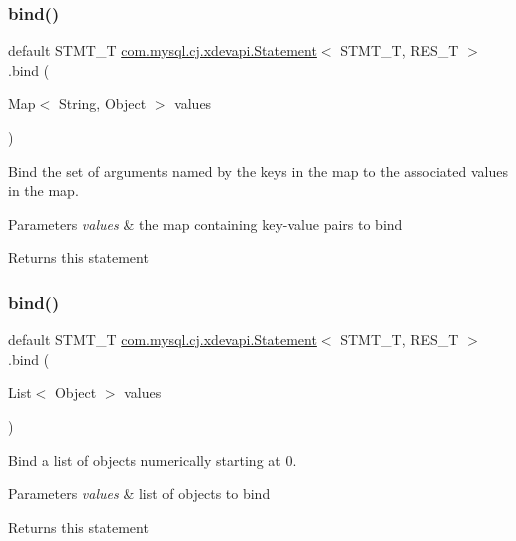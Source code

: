 \subsubsection{\texorpdfstring{bind()}{bind()}\hspace{0.1cm}{\footnotesize\ttfamily [2/4]}}
{\footnotesize\ttfamily default S\+T\+M\+T\+\_\+T \mbox{\hyperlink{interfacecom_1_1mysql_1_1cj_1_1xdevapi_1_1_statement}{com.\+mysql.\+cj.\+xdevapi.\+Statement}}$<$ S\+T\+M\+T\+\_\+T, R\+E\+S\+\_\+T $>$.bind (\begin{DoxyParamCaption}\item[{Map$<$ String, Object $>$}]{values }\end{DoxyParamCaption})}

Bind the set of arguments named by the keys in the map to the associated values in the map.


\begin{DoxyParams}{Parameters}
{\em values} & the map containing key-\/value pairs to bind \\
\hline
\end{DoxyParams}
\begin{DoxyReturn}{Returns}
this statement 
\end{DoxyReturn}
\mbox{\label{interfacecom_1_1mysql_1_1cj_1_1xdevapi_1_1_statement_a890c1608844aebef556cfe1a0638951d}} 
\subsubsection{\texorpdfstring{bind()}{bind()}\hspace{0.1cm}{\footnotesize\ttfamily [3/4]}}
{\footnotesize\ttfamily default S\+T\+M\+T\+\_\+T \mbox{\hyperlink{interfacecom_1_1mysql_1_1cj_1_1xdevapi_1_1_statement}{com.\+mysql.\+cj.\+xdevapi.\+Statement}}$<$ S\+T\+M\+T\+\_\+T, R\+E\+S\+\_\+T $>$.bind (\begin{DoxyParamCaption}\item[{List$<$ Object $>$}]{values }\end{DoxyParamCaption})}

Bind a list of objects numerically starting at 0.


\begin{DoxyParams}{Parameters}
{\em values} & list of objects to bind \\
\hline
\end{DoxyParams}
\begin{DoxyReturn}{Returns}
this statement 
\end{DoxyReturn}
\mbox{\label{interfacecom_1_1mysql_1_1cj_1_1xdevapi_1_1_statement_a9e14b71e366a4df30062bc2682751165}} 
